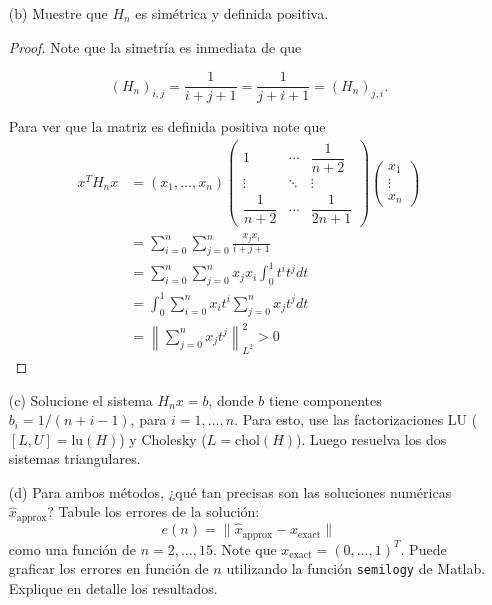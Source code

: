 \begin{enumerate}
\begin{proof}
    $$\sum_{j=0}^{n} a_j(H_n)_{k,j}=(H_n)_k\begin{pmatrix}
           a_{1} \\
           a_{2} \\
           \vdots \\
           a_{n}
         \end{pmatrix}=\int_0^1f(t)t^kdt=b_k,$$

donde $(H_n)_k$ denota la $k-$ésima fila de la matriz $(H_n)$, que es lo mismo que $H_n a=b$.


    \end{proof}

    \item[(b)] Muestre que $H_n$ es simétrica y definida positiva.\\

    \begin{proof}
    Note que la simetría es inmediata de  que

    $$(H_n)_{i,j}=\frac{1}{i+j+1}=\frac{1}{j+i+1}=(H_n)_{j,i}.$$

    Para ver que la matriz es definida positiva note que
    $$
\begin{aligned}
x^T H_n x & =\left(x_1, \ldots, x_n\right)\left(\begin{array}{ccc}
1 & \cdots & \dfrac{1}{n+2} \\
\vdots & \ddots & \vdots \\
\dfrac{1}{n+2} & \cdots & \dfrac{1}{2 n+1}
\end{array}\right)\left(\begin{array}{c}
x_1 \\
\vdots \\
x_n
\end{array}\right) \\
& =\sum_{i=0}^n \sum_{j=0}^n \frac{x_j x_i}{i+j+1} \\
& =\sum_{i=0}^n \sum_{j=0}^n x_j x_i \int_0^1 t^i t^j d t \\
& =\int_0^1 \sum_{i=0}^n x_i t^i \sum_{j=0}^n x_j t^j d t \\
& =\left\|\sum_{j=0}^{n} x_jt^j\right\|_{L^2}^2>0
\end{aligned}
$$
    \end{proof}

    \item[(c)] Solucione el sistema $H_n x = b$, donde $b$ tiene componentes $b_i = 1 / (n + i - 1)$, para $i = 1, \ldots, n$. Para esto, use las factorizaciones LU ($[L, U] = \text{lu}(H)$) y Cholesky ($L = \text{chol}(H)$). Luego resuelva los dos sistemas triangulares.
    \item[(d)] Para ambos métodos, ¿qué tan precisas son las soluciones numéricas $\hat{x}_{\text{approx}}$? Tabule los errores de la solución:
    \[
    e(n) = \|\hat{x}_{\text{approx}} - x_{\text{exact}}\|
    \]
    como una función de $n = 2, \ldots, 15$. Note que $x_{\text{exact}} = (0, \ldots, 1)^T$. Puede graficar los errores en función de $n$ utilizando la función \texttt{semilogy} de Matlab. Explique en detalle los resultados.
\end{enumerate}

